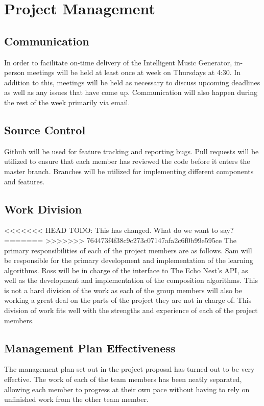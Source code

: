 \documentclass{article}
\begin{document}
\section{Project Management}
\subsection{Communication}
In order to facilitate on-time delivery of the Intelligent Music Generator, in-person meetings 
will be held at least once at week on Thursdays at 4:30. In addition to this, meetings will be 
held as necessary to discuss upcoming deadlines as well as any issues that have come up. 
Communication will also happen during the rest of the week primarily via email.


\subsection{Source Control}
Github will be used for feature tracking and reporting bugs.  Pull requests will be utilized to 
ensure that each member has reviewed the code before it enters the master branch.  Branches will 
be utilized for implementing different components and features.

\subsection{Work Division}
<<<<<<< HEAD
\Large{TODO: This has changed. What do we want to say?}
=======
>>>>>>> 764473f4f38c9c273c07147afa2c6f0b99e595ce
The primary responsibilities of each of the project members are as follows. Sam will be 
responsible for the primary development and implementation of the learning algorithms. Ross will 
be in charge of the interface to The Echo Nest's API, as well as the development and 
implementation of the composition algorithms. This is not a hard division of the work as each of 
the group members will also be working a great deal on the parts of the project they are not in
charge of. This division of work fits well with the strengths and experience of each of the 
project members.

\subsection{Management Plan Effectiveness}
The management plan set out in the project proposal has turned out to be very effective. The work
of each of the team members has been neatly separated, allowing each member to progress at their
own pace without having to rely on unfinished work from the other team member. 
\end{document}
